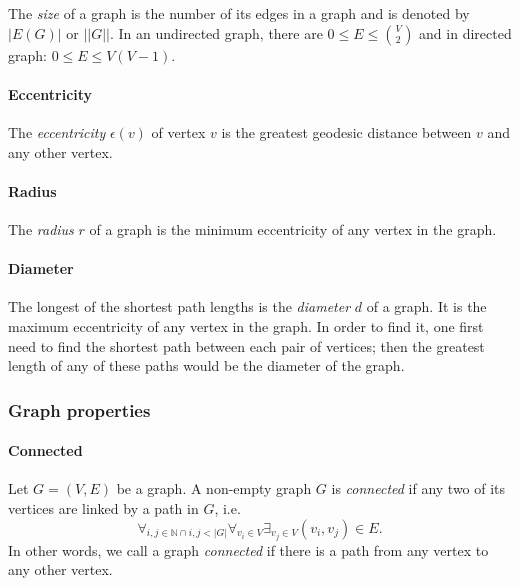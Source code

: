           The \emph{size} of a graph is the number of its edges\cite{Harris2000} in a graph and is denoted by $|E(G)|$ or $||G||$. In an undirected graph, there are $0 \leq E \leq \binom{V}{2}$ and in directed graph: $0 \leq E \leq V(V-1)$. 

        \paragraph{Eccentricity}    

          The \emph{eccentricity} $\epsilon(v)$ of vertex $v$ is the greatest geodesic distance between $v$ and any other vertex.    
                    
        \paragraph{Radius}

          The \emph{radius} $r$ of a graph is the minimum eccentricity of any vertex in the graph.

        \paragraph{Diameter}
        
          The longest of the shortest path lengths is the \emph{diameter} $d$ of a graph. It is the maximum eccentricity of any vertex in the graph. In order to find it, one first need to find the shortest path between each pair of vertices; then the greatest length of any of these paths would be the diameter of the graph.

      \subsubsection{Graph properties}

        \paragraph{Connected}

          Let $G = (V, E)$ be a graph. A non-empty graph $G$ is \emph{connected} if any two of its vertices are linked by a path in $G$, i.e. 
          \begin{equation}
            \forall_{i,j \in \mathbb{N} \cap i,j < |G|} \forall_{v_i \in V} \exists_{v_j \in V} (v_i, v_j) \in E\mbox{.}
          \end{equation}
          In other words, we call a graph \emph{connected} if there is a path from any vertex to any other vertex.

